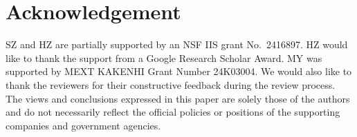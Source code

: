\section*{Acknowledgement}
SZ and HZ are partially supported by an NSF IIS grant No.\ 2416897. HZ would like to thank the support from a Google Research Scholar Award. MY was supported by MEXT KAKENHI Grant Number 24K03004. We would also like to thank the reviewers for their constructive feedback during the review process. The views and conclusions expressed in this paper are solely those of the authors and do not necessarily reflect the official policies or positions of the supporting companies and government agencies.